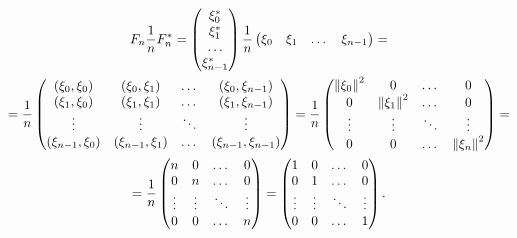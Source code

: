 \begin{multline*}
    F_n \frac{1}{n} F_n^*
    =
    \begin{pmatrix}
        \xi_0^* \\
        \xi_1^* \\
        \dots   \\
        \xi_{n-1}^*
    \end{pmatrix}
    \frac{1}{n}
    \begin{pmatrix}
        \xi_0 & \xi_1 & \dots & \xi_{n-1}
    \end{pmatrix} = \\
    = \frac{1}{n}
    \begin{pmatrix}
        \left ( \xi_0, \xi_0 \right )     & \left ( \xi_0, \xi_1 \right )     & \dots  & \left ( \xi_0, \xi_{n-1} \right )     \\
        \left ( \xi_1, \xi_0 \right )     & \left ( \xi_1, \xi_1 \right )     & \dots  & \left ( \xi_1, \xi_{n-1} \right )     \\
        \vdots                           & \vdots                           & \ddots & \vdots                               \\
        \left ( \xi_{n-1}, \xi_0 \right ) & \left ( \xi_{n-1}, \xi_1 \right ) & \dots  & \left ( \xi_{n-1}, \xi_{n-1} \right )
    \end{pmatrix}
    = \frac{1}{n}
    \begin{pmatrix}
        \left \| \xi_0 \right \|^2 & 0              & \dots  & 0              \\
        0              & \left \| \xi_1 \right \|^2 & \dots  & 0              \\
        \vdots         & \vdots         & \ddots & \vdots         \\
        0              & 0              & \dots  & \left \| \xi_n \right \|^2
    \end{pmatrix}
    = \\
    = \frac{1}{n}
    \begin{pmatrix}
        n      & 0      & \dots  & 0      \\
        0      & n      & \dots  & 0      \\
        \vdots & \vdots & \ddots & \vdots \\
        0      & 0      & \dots  & n
    \end{pmatrix}
    =
    \begin{pmatrix}
        1      & 0      & \dots  & 0      \\
        0      & 1      & \dots  & 0      \\
        \vdots & \vdots & \ddots & \vdots \\
        0      & 0      & \dots  & 1
    \end{pmatrix}
    .
\end{multline*}

